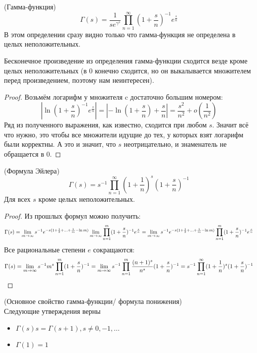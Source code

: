 \begin{definition}
	(Гамма-функция)
	\[
	\Gamma(s) = \frac{1}{se^{\gamma^s}}\prod\limits_{n=1}^\infty(1+\frac{s}{n})^{-1}e^{\frac{s}{n}}
	\]
	В этом определении сразу видно только что гамма-функция не определена в целых неположительных.
\end{definition}

\begin{proposition}
	Бесконечное произведение из определения гамма-функции сходится везде кроме целых неположительных (в 0 конечно сходится, но он выкалывается множителем перед произведением, поэтому нам неинтересен).
\end{proposition}

\begin{proof}
	Возьмём логарифм у множителя c достаточно большим номером:
	\[
	|\ln{(1+\frac{s}{n})^{-1}}e^{\frac{s}{n}}| = \left|-\ln{(1+\frac{s}{n})} + \frac{s}{n}\right| = \frac{s^2}{n^2} + o{(\frac{1}{n^2})}
	\]
	Ряд из полученного выражения, как известно, сходится при любом $s$. Значит всё что нужно, это чтобы все множители идущие до тех, у которых взят логарифм были корректны. А это и значит, что $s$ неотрицательно, и знаменатель не обращается в 0.
\end{proof}

\begin{theorem}
	(Формула Эйлера)
	\[
	\Gamma(s)=s^{-1}\prod\limits_{n=1}^\infty(1+\frac{1}{n})^s(1+\frac{s}{n})^{-1}
	\]
	Для всех $s$ кроме целых неположительных.
\end{theorem}

\begin{proof} Из прошлых формул можно получить:
	\[
	\Gamma(s) = \lim\limits_{m\to\infty} s^{-1}e^{-s( 1 + \frac{1}{2}+...+\frac{1}{m} - \ln{m})}\lim\limits_{m\to\infty}\prod\limits_{n=1}^m(1+\frac{s}{n})^{-1}e^{\frac{s}{n}} = \lim\limits_{m\to\infty} s^{-1}e^{-s( 1 + \frac{1}{2}+...+\frac{1}{m} - \ln{m})}\prod\limits_{n=1}^m(1+\frac{s}{n})^{-1}e^{\frac{s}{n}}
	\]
	Все рациональные степени $e$ сокращаются:
	\[
	\Gamma(s)= \lim\limits_{m\to\infty} s^{-1}m^s\prod\limits_{n=1}^m(1+\frac{s}{n})^{-1} = \lim\limits_{m\to\infty} s^{-1}\prod\limits_{n=1}^m\frac{(n+1)^s}{n^s}(1+\frac{s}{n})^{-1} = s^{-1}\prod\limits_{n=1}^\infty(1+\frac{1}{n})^s(1+\frac{s}{n})^{-1}
	\]
\end{proof}

\begin{theorem}
	(Основное свойство гамма-функции/ формула понижения) \\
	Следующие утверждения верны
	\begin{itemize}
		\item $\Gamma(s)s = \Gamma(s + 1), s \neq 0, -1, ...$
		\item $\Gamma(1) = 1$
		
	\end{itemize}
\end{theorem}


